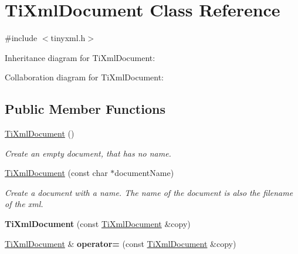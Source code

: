 \hypertarget{class_ti_xml_document}{
\section{\-Ti\-Xml\-Document \-Class \-Reference}
\label{class_ti_xml_document}
}


{\ttfamily \#include $<$tinyxml.\-h$>$}



\-Inheritance diagram for \-Ti\-Xml\-Document\-:


\-Collaboration diagram for \-Ti\-Xml\-Document\-:
\subsection*{\-Public \-Member \-Functions}
\begin{DoxyCompactItemize}
\item 
\hypertarget{class_ti_xml_document_a9f5e84335708fde98400230f9f12659c}{
\hyperlink{class_ti_xml_document_a9f5e84335708fde98400230f9f12659c}{\-Ti\-Xml\-Document} ()}
\label{class_ti_xml_document_a9f5e84335708fde98400230f9f12659c}

\begin{DoxyCompactList}\small\item\em \-Create an empty document, that has no name. \end{DoxyCompactList}\item 
\hypertarget{class_ti_xml_document_ae4508b452d0c3061db085f3db27b8396}{
\hyperlink{class_ti_xml_document_ae4508b452d0c3061db085f3db27b8396}{\-Ti\-Xml\-Document} (const char $\ast$document\-Name)}
\label{class_ti_xml_document_ae4508b452d0c3061db085f3db27b8396}

\begin{DoxyCompactList}\small\item\em \-Create a document with a name. \-The name of the document is also the filename of the xml. \end{DoxyCompactList}\item 
\hypertarget{class_ti_xml_document_a323a7486e7da6099cdc19a5ff7e74b07}{
{\bfseries \-Ti\-Xml\-Document} (const \hyperlink{class_ti_xml_document}{\-Ti\-Xml\-Document} \&copy)}
\label{class_ti_xml_document_a323a7486e7da6099cdc19a5ff7e74b07}

\item 
\hypertarget{class_ti_xml_document_aa56fd4dbe8917d2033d865909e2d737e}{
\hyperlink{class_ti_xml_document}{\-Ti\-Xml\-Document} \& {\bfseries operator=} (const \hyperlink{class_ti_xml_document}{\-Ti\-Xml\-Document} \&copy)}
\label{class_ti_xml_document_aa56fd4dbe8917d2033d865909e2d737e}


\end{DoxyCompactItemize}
